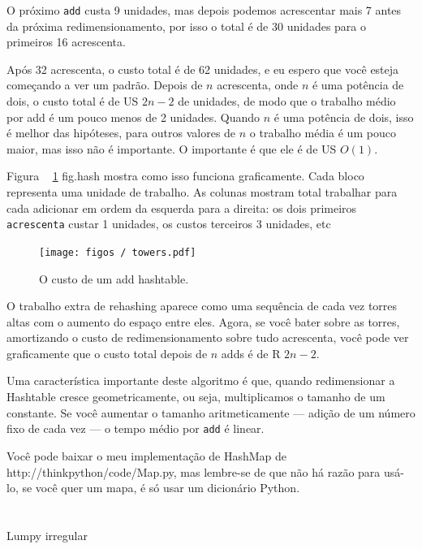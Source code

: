 \documentclass[10pt]{book}
\begin{document}
\begin{v erbatim}
O próximo {\tt add} custa 9 unidades, mas depois podemos acrescentar mais 7
antes da próxima redimensionamento, por isso o total é de 30 unidades para o
primeiros 16 acrescenta.

Após 32 acrescenta, o custo total é de 62 unidades, e eu espero que você esteja começando
a ver um padrão. Depois de $ n $ acrescenta, onde $ n $ é uma potência de dois, o
custo total é de US $ 2n-2 $ de unidades, de modo que o trabalho médio por add é
um pouco menos de 2 unidades. Quando $ n $ é uma potência de dois, isso é
melhor das hipóteses, para outros valores de $ n $ o trabalho média é um pouco
maior, mas isso não é importante. O importante é que ele
é de US $ O (1) $.

Figura ~ \ref {} fig.hash mostra como isso funciona graficamente. Cada
bloco representa uma unidade de trabalho. As colunas mostram total
trabalhar para cada adicionar em ordem da esquerda para a direita: os dois primeiros
{\tt acrescenta} custar 1 unidades, os custos terceiros 3 unidades, etc

\begin{figure}
\centerline {\texttt{[image: figos / towers.pdf]}}
\caption{O custo de um add hashtable. \label{fig.hash}}
\end{figure}

O trabalho extra de rehashing aparece como uma sequência de cada vez
torres altas com o aumento do espaço entre eles. Agora, se você bater
sobre as torres, amortizando o custo de redimensionamento sobre tudo
acrescenta, você pode ver graficamente que o custo total depois de $ n $
adds é de R $ 2n - 2 $.

Uma característica importante deste algoritmo é que, quando redimensionar a
Hashtable cresce geometricamente, ou seja, multiplicamos o tamanho de um
constante. Se você aumentar o tamanho
aritmeticamente --- adição de um número fixo de cada vez --- o tempo médio
por {\tt add} é linear.

Você pode baixar o meu implementação de HashMap de
\url{} http://thinkpython/code/Map.py, mas lembre-se de que não
há razão para usá-lo, se você quer um mapa, é só usar um dicionário Python.






\chapter{} Lumpy
\label{} irregular


\end{v erbatim}
\end{document}

